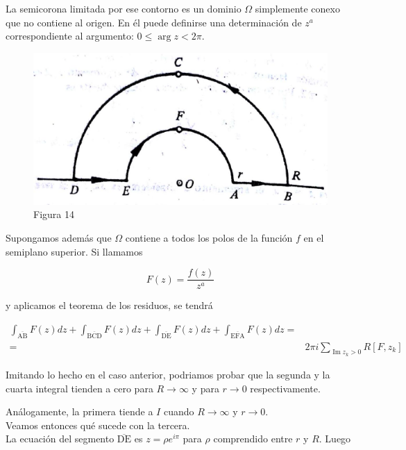\documentclass[10pt]{article}
\theoremstyle{plain}
\theoremstyle{definition}
\theoremstyle{remark}
\begin{document}
La semicorona limitada por ese contorno es un dominio $\Omega$ simplemente conexo que no contiene al origen. En él puede definirse una determinación de $z^{a}$ correspondiente al argumento: $0 \leqslant \arg z<2 \pi$.

\begin{figure}[h]
\begin{center}
  \includegraphics[width=\textwidth]{2025_09_05_adecef5eb2053bc129b5g-101}
\captionsetup{labelformat=empty}
\caption{Figura 14}
\end{center}
\end{figure}

Supongamos además que $\Omega$ contiene a todos los polos de la función $f$ en el semiplano superior. Si llamamos

$$
F(z)=\frac{f(z)}{z^{a}}
$$

y aplicamos el teorema de los residuos, se tendrá

$$
\begin{aligned}
\int_{\overline{\mathrm{AB}}} F(z) d z+\int_{\overline{\mathrm{BCD}}} F(z) d z+\int_{\overline{\mathrm{DE}}} F(z) d z+\int_{\overline{\mathrm{EFA}}} F(z) d z= & \\
= & 2 \pi i \sum_{\operatorname{Im} z_{k}>0} R\left[F, z_{k}\right]
\end{aligned}
$$

Imitando lo hecho en el caso anterior, podriamos probar que la segunda y la cuarta integral tienden a cero para $R \rightarrow \infty$ y para $r \rightarrow 0$ respectivamente.

Análogamente, la primera tiende a $I$ cuando $R \rightarrow \infty$ y $r \rightarrow 0$.\\
Veamos entonces qué sucede con la tercera.\\
La ecuación del segmento $\overline{\mathrm{DE}}$ es $z=\rho e^{i \pi}$ para $\rho$ comprendido entre $r$ y $R$. Luego
\end{document}
